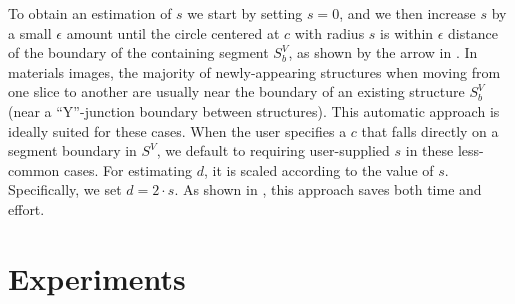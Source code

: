 \documentclass[]{spie}  %
\begin{document}
To obtain an estimation of $s$ we start by setting $s=0$, and we then
increase $s$ by a small $\epsilon$ amount until the circle centered at
$c$ with radius $s$ is within $\epsilon$ distance of the boundary of
the containing segment $S^V_b$, as shown by the arrow in
.  In materials images, the majority of
newly-appearing structures when moving from one slice to another are
usually near the boundary of an existing structure $S^V_b$ (near a
``Y''-junction boundary between structures).  This automatic approach
is ideally suited for these cases.  When the user specifies a $c$ that
falls directly on a segment boundary in $S^V$, we default to requiring
user-supplied $s$ in these less-common cases.  For estimating $d$, it
is scaled according to the value of $s$.  Specifically, we set $d =
2\cdot s$.  As shown in , this approach saves both time and
effort.


\section{Experiments}
\label{sec:ex}

\end{document}
